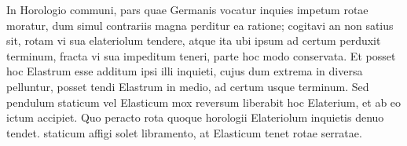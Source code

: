                 \vspace*{8mm}
                \pstart 
                \normalsize
            \noindent[171~r\textsuperscript{o}] In Horologio\protect{} communi, pars quae Germanis vocatur inquies\protect{} impetum rotae moratur, dum simul contrariis  magna perditur ea ratione; cogitavi an non satius sit, rotam vi sua elateriolum\protect{} tendere, atque ita ubi ipsum ad certum perduxit terminum, fracta vi sua impeditum teneri,  parte hoc modo conservata. Et posset hoc Elastrum esse additum ipsi illi inquieti, cujus dum extrema in diversa pelluntur, posset tendi Elastrum in medio, ad certum usque terminum. Sed pendulum staticum vel Elasticum mox reversum liberabit hoc Elaterium, et ab eo ictum accipiet. Quo peracto rota quoque horologii Elateriolum inquietis denuo tendet.\pend \pstart {} staticum affigi solet libramento, at Elasticum tenet  rotae serratae. \pend
 


 

